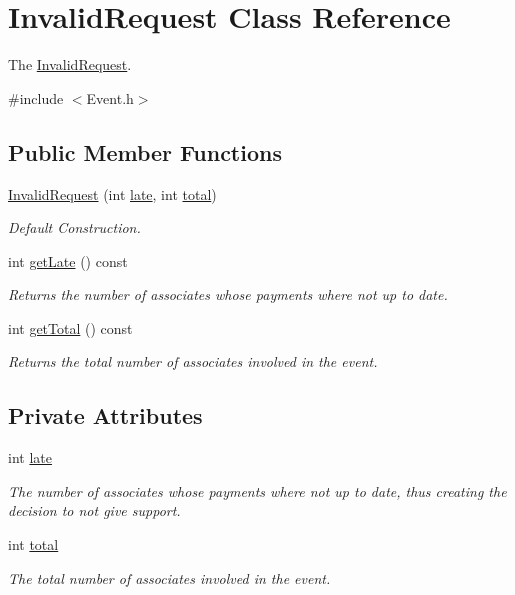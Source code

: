 \hypertarget{classInvalidRequest}{}\section{Invalid\+Request Class Reference}
\label{classInvalidRequest}


The \mbox{\hyperlink{classInvalidRequest}{Invalid\+Request}}.  




{\ttfamily \#include $<$Event.\+h$>$}

\subsection*{Public Member Functions}
\begin{DoxyCompactItemize}
\item 
\mbox{\hyperlink{classInvalidRequest_aff6963764c0246d2af135fc810cd98b1}{Invalid\+Request}} (int \mbox{\hyperlink{classInvalidRequest_a658c907cf50b5f171ec30bcb40cae2e9}{late}}, int \mbox{\hyperlink{classInvalidRequest_aaf6dbebd550f136ce6a4c908a8c2d9b8}{total}})
\begin{DoxyCompactList}\small\item\em Default Construction. \end{DoxyCompactList}\item 
int \mbox{\hyperlink{classInvalidRequest_a84e0946f534316dbc313e81adfd86b19}{get\+Late}} () const
\begin{DoxyCompactList}\small\item\em Returns the number of associates whose payments where not up to date. \end{DoxyCompactList}\item 
int \mbox{\hyperlink{classInvalidRequest_aab3f76dbf45d395e92622d1eb6d69948}{get\+Total}} () const
\begin{DoxyCompactList}\small\item\em Returns the total number of associates involved in the event. \end{DoxyCompactList}\end{DoxyCompactItemize}
\subsection*{Private Attributes}
\begin{DoxyCompactItemize}
\item 
int \mbox{\hyperlink{classInvalidRequest_a658c907cf50b5f171ec30bcb40cae2e9}{late}}
\begin{DoxyCompactList}\small\item\em The number of associates whose payments where not up to date, thus creating the decision to not give support. \end{DoxyCompactList}\item 
int \mbox{\hyperlink{classInvalidRequest_aaf6dbebd550f136ce6a4c908a8c2d9b8}{total}}
\begin{DoxyCompactList}\small\item\em The total number of associates involved in the event. \end{DoxyCompactList}\end{DoxyCompactItemize}


